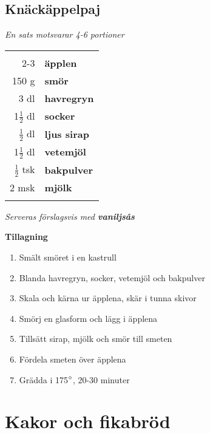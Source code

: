 \documentclass[a4paper,12pt]{article}
\newcommand{\tillb}[1]{\noindent \textit{Serveras förslagsvis med \textbf{#1}} \vspace{1cm}}
\newcommand{\sats}[1]{\noindent \textit{En sats motsvarar #1}}
\begin{document}
\clearpage

\subsection{Knäckäppelpaj}
\sats{4-6 portioner}

\begin{table}[H]
	\begin{tabular}{rl}
	\hline
	&\\
		2-3 & \textbf{äpplen}\\
		150 g & \textbf{smör}\\
		3 dl & \textbf{havregryn}\\
		1$\frac{1}{2}$ dl & \textbf{socker}\\
		$\frac{1}{2}$ dl & \textbf{ljus sirap}\\
		1$\frac{1}{2}$ dl & \textbf{vetemjöl}\\
		$\frac{1}{2}$ tsk & \textbf{bakpulver}\\
		2 msk & \textbf{mjölk}\\
	&\\
	\hline
	\end{tabular}
\end{table}

\tillb{vaniljsås}

\begin{multicols*}{2}

\noindent \textbf{Tillagning}
\begin{enumerate}
	\itemsep0cm
	\item Smält smöret i en kastrull
	\item Blanda havregryn, socker, vetemjöl och bakpulver
	\item Skala och kärna ur äpplena, skär i tunna skivor
	\item Smörj en glasform och lägg i äpplena
	\item Tillsätt sirap, mjölk och smör till smeten
	\item Fördela smeten över äpplena
	\item Grädda i 175$\degree$, 20-30 \mbox{minuter}
\end{enumerate}

\end{multicols*}

\clearpage


\section{Kakor och fikabröd}
\end{document}
